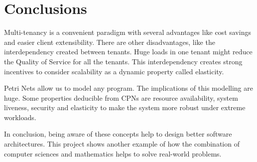 \documentclass[12pt,english]{article} %
\begin{document}
\newpage

\section{Conclusions}
Multi-tenancy is a convenient paradigm with several advantages like cost savings and easier client extensibility.
There are other disadvantages, like the interdependency created between tenants.
Huge loads in one tenant might reduce the Quality of Service for all the tenants.
This interdependency creates strong incentives to consider scalability as a dynamic property called elasticity.

Petri Nets allow us to model any program.
The implications of this modelling are huge.
Some properties deducible from CPNs are resource availability, system liveness, security and elasticity to make the system more robust under extreme workloads.

In conclusion, being aware of these concepts help to design better software architectures.
This project shows another example of how the combination of computer sciences and mathematics helps to solve real-world problems.
\end{document}

